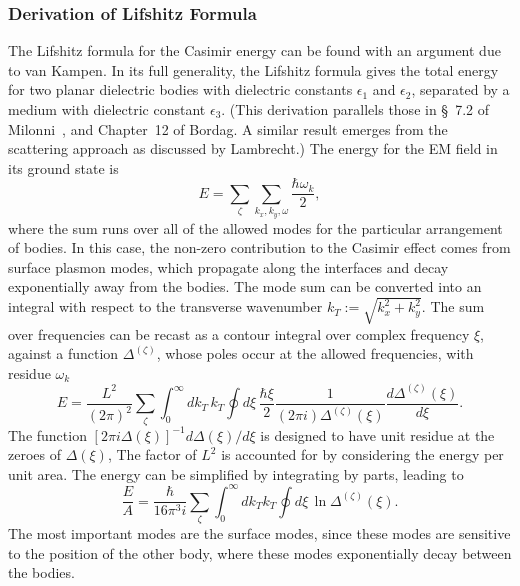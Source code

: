 \subsubsection{Derivation of Lifshitz Formula}
\label{sec:lifshitz}
The Lifshitz formula for the Casimir energy can be found with an argument due to van Kampen\etal\cite{vanKampen1968}.
In its full generality, the Lifshitz formula gives the total energy for two planar dielectric bodies with dielectric constants 
$\epsilon_1$ and $\epsilon_2$,
separated by a medium with dielectric constant $\epsilon_3$.  
(This derivation parallels those in \S~7.2 of Milonni~\cite{Milonni1994}, and Chapter~12 of Bordag\etal\cite{Bordag2009}.
A similar result emerges from the scattering approach as discussed by Lambrecht\etal\cite{Lambrecht2011}.)
The energy for the EM field in its ground state is 
\begin{equation}
  E = \sum_{\zeta}\sum_{k_x,k_y,\omega} \frac{\hbar\omega_k}{2},
\end{equation}
where the sum runs over all of the allowed modes for the particular arrangement of bodies.  
In this case, the  non-zero contribution to the Casimir effect comes from surface plasmon modes, which propagate along the interfaces
and decay exponentially away from the bodies.  
The mode sum can be converted into an integral with respect to the transverse wavenumber $k_T:=\sqrt{k_x^2+k_y^2}$.
The sum over frequencies can be recast as a contour integral over complex frequency $\xi$, against a function $\Delta^{(\zeta)}$,
 whose poles occur at the allowed frequencies, with residue $\omega_k$  
\begin{equation}
  E = \frac{L^2}{(2\pi)^2}\sum_{\zeta}\int_0^\infty dk_T\,k_T\oint d\xi\, 
  \frac{\hbar \xi}{2} \frac{1}{(2\pi i)\Delta^{(\zeta)}(\xi)}\frac{d\Delta^{(\zeta)}(\xi)}{d\xi}.
\end{equation}
The function $[2\pi i\Delta(\xi)]^{-1}d\Delta(\xi)/d\xi$ is designed to have unit residue at the zeroes of $\Delta(\xi)$, 
The factor of $L^2$ is accounted for by considering the energy per unit area.  
The energy can be simplified by integrating by parts, leading to 
\begin{equation}
  \frac{E}{A} = \frac{\hbar}{16\pi^3 i}\sum_{\zeta}\int_0^\infty dk_Tk_T\oint d\xi \, \ln\Delta^{(\zeta)}(\xi).
  \label{eq:lifshitz_logDelta}
\end{equation}
The most important modes are the surface modes, since these modes are sensitive to the position of the other body, where
these modes exponentially decay between the bodies.

